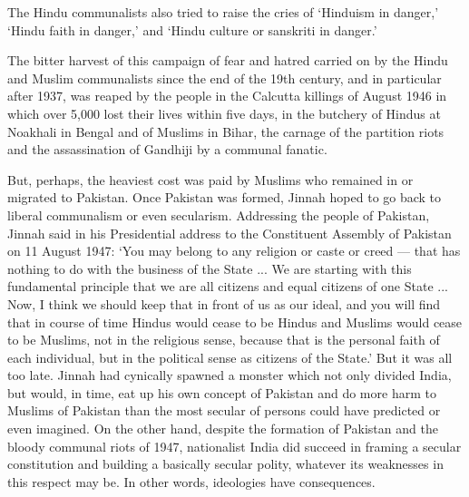 \begin{multicols}{2}
The Hindu communalists also tried to raise the cries of `Hinduism in danger,' `Hindu faith in danger,' and `Hindu culture or sanskriti in danger.' 

The bitter harvest of this campaign of fear and hatred carried on by the Hindu and Muslim communalists since the end of the 19th century, and in particular after 1937, was reaped by the people in the Calcutta killings of August 1946 in which over 5,000 lost their lives within five days, in the butchery of Hindus at Noakhali in Bengal and of Muslims in Bihar, the carnage of the partition riots and the assassination of Gandhiji by a communal fanatic. 

But, perhaps, the heaviest cost was paid by Muslims who remained in or migrated to Pakistan. Once Pakistan was formed, Jinnah hoped to go back to liberal communalism or even secularism. Addressing the people of Pakistan, Jinnah said in his Presidential address to the Constituent Assembly of Pakistan on 11 August 1947: `You may belong to any religion or caste or creed --- that has nothing to do with the business of the State ... We are starting with this fundamental principle that we are all citizens and equal citizens of one State ... Now, I think we should keep that in front of us as our ideal, and you will find that in course of time Hindus would cease to be Hindus and Muslims would cease to be Muslims, not in the religious sense, because that is the personal faith of each individual, but in the political sense as citizens of the State.' But it was all too late. Jinnah had cynically spawned a monster which not only divided India, but would, in time, eat up his own concept of Pakistan and do more harm to Muslims of Pakistan than the most secular of persons could have predicted or even imagined. On the other hand, despite the formation of Pakistan and the bloody communal riots of 1947, nationalist India did succeed in framing a secular constitution and building a basically secular polity, whatever its weaknesses in this respect may be. In other words, ideologies have consequences. 


\end{multicols}
